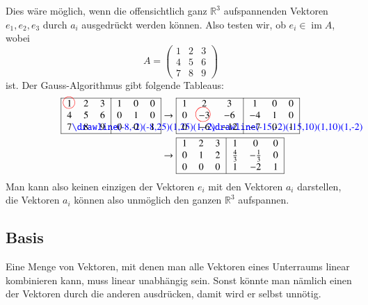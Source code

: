 \begin{beispiel}
Dies wäre möglich, wenn die offensichtlich ganz $\mathbb R^3$
aufspannenden Vektoren $e_1,e_2,e_3$ durch $a_i$ ausgedrückt werden
können.
Also testen wir, ob $e_i\in \operatorname{im}A$, wobei
\[
A=\begin{pmatrix}
1&2&3\\
4&5&6\\
7&8&9
\end{pmatrix}
\]
ist.
Der Gauss-Algorithmus gibt folgende Tableaus:
\begin{align*}
\begin{tabular}{|>{$}c<{$}>{$}c<{$}>{$}c<{$}|>{$}c<{$}>{$}c<{$}>{$}c<{$}|}
\hline
1%
\begin{picture}(0,0)
\color{red}\put(-3,4){\circle{12}}
\end{picture}%
&2&3&1&0&0\\
4&5&6&0&1&0\\
7%
\begin{picture}(0,0)
\color{blue}\drawline(-8,-2)(-8,25)(1,25)(1,-2)
\end{picture}%
&8&9&0&0&1\\
\hline
\end{tabular}
&\rightarrow
\begin{tabular}{|>{$}c<{$}>{$}c<{$}>{$}c<{$}|>{$}c<{$}>{$}c<{$}>{$}c<{$}|}
\hline
1&2&3&1&0&0\\
0&-3%
\begin{picture}(0,0)
\color{red}\put(-7,4){\circle{15}}
\end{picture}%
&-6&-4&1&0\\
0&-6%
\begin{picture}(0,0)
\color{blue}\drawline(-15,-2)(-15,10)(1,10)(1,-2)
\end{picture}%
&-12&-7&0&1\\
\hline
\end{tabular}
\\
&\rightarrow
\begin{tabular}{|>{$}c<{$}>{$}c<{$}>{$}c<{$}|>{$}c<{$}>{$}c<{$}>{$}c<{$}|}
\hline
1&2&3&1&0&0\\
0&1&2&\frac43&-\frac13&0\\
0&0&0&1&-2&1\\
\hline
\end{tabular}
\end{align*}
Man kann also keinen einzigen der Vektoren $e_i$ mit den Vektoren $a_i$
darstellen, die Vektoren $a_i$ können also unmöglich den ganzen
$\mathbb R^3$ aufspannen.
\end{beispiel}

\subsection{Basis}
Eine Menge von Vektoren, mit denen man alle Vektoren eines Unterraums
linear kombinieren kann, muss linear unabhängig sein.
Sonst könnte
man nämlich einen der Vektoren durch die anderen ausdrücken, damit
wird er selbst unnötig.

